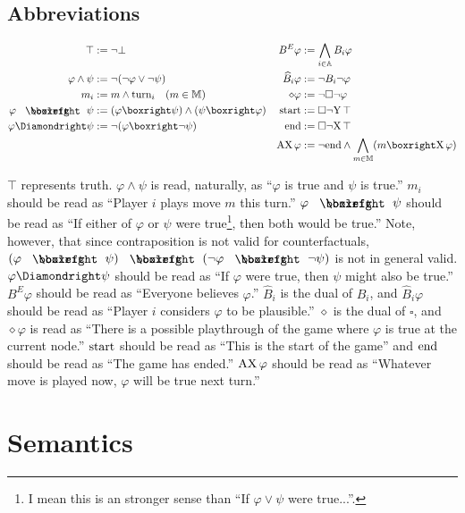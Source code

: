 \documentclass{article}
\begin{document}
\subsection{Abbreviations}
\begin{align*}
    \top&:=\lnot\bot&B^E\varphi&:=\bigwedge_{i\in\Agt}B_i\varphi\\
    \varphi\land\psi&:=\lnot(\lnot\varphi\lor\lnot\psi)&\widehat{B}_i\varphi&:=\lnot B_i\lnot\varphi\\
    m_i&:=m\land\turn_i\text{\quad}(m\in\Act)&\diamond\varphi&:=\lnot\square\lnot\varphi\\
    \varphi\boxiff\psi&:=(\varphi\boxright\psi)\land(\psi\boxright\varphi)&\beg&:=\square\lnot\Y\top\\
    \varphi\Diamondright\psi&:=\lnot(\varphi\boxright\lnot\psi)&\fin&:=\square\lnot\X\top\\
    &&\AX\varphi&:=\lnot\fin\land\bigwedge_{m\in\Act}(m\boxright\X\varphi)
\end{align*}

$\top$ represents truth. $\varphi\land\psi$  is read, naturally, as ``$\varphi$ is true and $\psi$ is true.'' $m_i$ should be read as ``Player $i$ plays move $m$ this turn.'' $\varphi\boxiff\psi$ should be read as ``If either of $\varphi$ or $\psi$ were true\footnote{I mean this is an stronger sense than ``If $\varphi\lor\psi$ were true...''.}, then both would be true.'' Note, however, that since contraposition is not valid for counterfactuals, $(\varphi\boxiff\psi)\boxiff(\lnot\varphi\boxiff\lnot\psi)$ is not in general valid. $\varphi\Diamondright\psi$ should be read as ``If $\varphi$ were true, then $\psi$ might also be true.'' $B^E\varphi$ should be read as ``Everyone believes $\varphi$.''  $\widehat{B}_i$ is the dual of $B_i$, and $\widehat{B}_i\varphi$ should be read as ``Player $i$ considers $\varphi$ to be plausible.'' $\diamond$ is the dual of $\square$, and $\diamond\varphi$ is read as ``There is a possible playthrough of the game where $\varphi$ is true at the current node.'' $\text{start}$ should be read as ``This is the start of the game'' and $\text{end}$ should be read as ``The game has ended.'' $\text{AX}\,\varphi$ should be read as ``Whatever move is played now, $\varphi$ will be true next turn.''
\section{Semantics}
\end{document}
